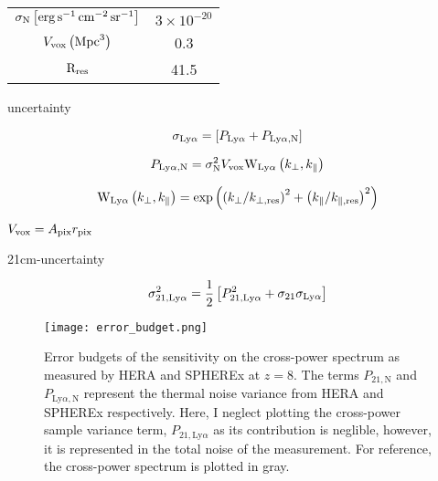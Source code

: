 \begin{table}[]
\begin{tabular}{cc}
\multicolumn{1}{c|}{$\sigma_{\rm N} \left[ \rm erg \, s^{-1} \, cm^{-2} \, sr^{-1}\right]$} & $3 \times 10^{-20}$                                            \\
\multicolumn{1}{c|}{$V_{\rm vox} \left(\textrm{Mpc}^{3} \right)$}                                         & 0.3                                                            \\
\multicolumn{1}{c|}{$\textrm{R}_{\rm res}$}                                                 & 41.5                                                           \\ \hline
\end{tabular}
\end{table}

\lya uncertainty

\begin{equation}
  \sigma_{\rm Ly\alpha} = \left[ P_{\rm Ly\alpha} + P_{\textrm{Ly}\alpha, \textrm{N}} \right]
\end{equation}

\begin{equation}
P_{\textrm{Ly}\alpha, \textrm{N}} = \sigma_{\rm N}^2 V_{\text{vox}} \textrm{W}_{\rm Ly\alpha}\left(k_{\perp}, k_{\parallel}\right)
\end{equation}

\begin{equation}
  \textrm{W}_{\rm Ly\alpha}\left( k_{\perp}, k_{\parallel} \right) = \exp \left(\left( k_{\perp} / k_{\perp, \textrm{res}}\right)^2 + \left( k_{\parallel} / k_{\parallel, \textrm{res}}\right)^2\right)
\end{equation}


$V_{\rm vox} = A_{\rm pix} r_{\rm pix}$

21cm-\lya uncertainty


\begin{equation}
    \sigma^2_{21, \rm Ly\alpha} = \frac{1}{2} \left[ P^2_{21, \rm Ly\alpha} + \sigma_{21} \sigma_{\rm Ly\alpha} \right]
\end{equation}

\begin{figure}[th]
	\centering
	\texttt{[image: error\_budget.png]}
	\caption[Cross-Power Spectrum Error Budget]{Error budgets of the sensitivity on the cross-power spectrum as measured by HERA and SPHEREx
  at $z = 8$. The terms $P_{21, \textrm{N}}$ and $P_{\textrm{Ly}\alpha, \textrm{N}}$ represent the thermal noise variance from HERA and SPHEREx respectively. Here, I neglect plotting the cross-power sample variance term, $P_{21, \textrm{Ly}\alpha }$ as its contribution is neglible, however, it is represented in the total noise of the measurement. For reference, the cross-power spectrum is plotted in gray.}
	\label{fig:error_budget}
\end{figure}

